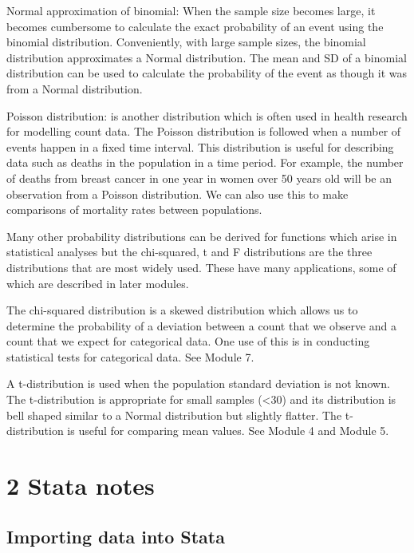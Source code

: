 \documentclass[
]{memoir}
\begin{document}
Normal approximation of binomial: When the sample size becomes large, it becomes cumbersome to calculate the exact probability of an event using the binomial distribution. Conveniently, with large sample sizes, the binomial distribution approximates a Normal distribution. The mean and SD of a binomial distribution can be used to calculate the probability of the event as though it was from a Normal distribution.

Poisson distribution: is another distribution which is often used in health research for modelling count data. The Poisson distribution is followed when a number of events happen in a fixed time interval. This distribution is useful for describing data such as deaths in the population in a time period. For example, the number of deaths from breast cancer in one year in women over 50 years old will be an observation from a Poisson distribution. We can also use this to make comparisons of mortality rates between populations.

Many other probability distributions can be derived for functions which arise in statistical analyses but the chi-squared, t and F distributions are the three distributions that are most widely used. These have many applications, some of which are described in later modules.

The chi-squared distribution is a skewed distribution which allows us to determine the probability of a deviation between a count that we observe and a count that we expect for categorical data. One use of this is in conducting statistical tests for categorical data. See Module 7.

A t-distribution is used when the population standard deviation is not known. The t-distribution is appropriate for small samples (\textless30) and its distribution is bell shaped similar to a Normal distribution but slightly flatter. The t-distribution is useful for comparing mean values. See Module 4 and Module 5.

\hypertarget{stata-notes}{%
\chapter*{\texorpdfstring{\textbf{2} Stata notes}{2 Stata notes}}\label{stata-notes}}

\hypertarget{importing-data-into-stata}{%
\section{Importing data into Stata}\label{importing-data-into-stata}}
\end{document}
